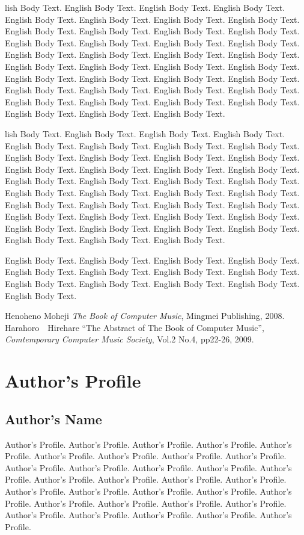 \documentclass{jsarticle}
\begin{document}
lish Body Text. English Body Text. English Body Text. English Body
Text. English Body Text. English Body Text. English Body Text. English
Body Text. English Body Text. English Body Text. English Body
Text. English Body Text. English Body Text. English Body Text. English
Body Text. English Body Text. English Body Text. English Body
Text. English Body Text. English Body Text. English Body Text. English
Body Text. English Body Text. English Body Text. English Body
Text. English Body Text. English Body Text. English Body Text. English
Body Text. English Body Text. English Body Text. English Body
Text. English Body Text. English Body Text. English Body Text. English
Body Text. English Body Text. English Body Text. English Body Text. 

lish Body Text. English Body Text. English Body Text. English Body
Text. English Body Text. English Body Text. English Body Text. English
Body Text. English Body Text. English Body Text. English Body
Text. English Body Text. English Body Text. English Body Text. English
Body Text. English Body Text. English Body Text. English Body
Text. English Body Text. English Body Text. English Body Text. English
Body Text. English Body Text. English Body Text. English Body
Text. English Body Text. English Body Text. English Body Text. English
Body Text. English Body Text. English Body Text. English Body
Text. English Body Text. English Body Text. English Body Text. English
Body Text. English Body Text. English Body Text. English Body Text. 

English Body Text. English Body Text. English Body Text. English
Body Text. English Body Text. English Body Text. English Body
Text. English Body Text. English Body Text. English Body Text. English
Body Text. English Body Text. English Body Text.


\begin{thebibliography}{citations}
 Henoheno Moheji {\it The Book of Computer Music},
	Mingmei Publishing, 2008.
 Harahoro　Hirehare ``The Abstract of The Book of
	Computer Music'', {\it Comtemporary Computer Music Society},
	Vol.2 No.4, pp22-26, 2009.
\end{thebibliography}

\section{Author's Profile}


\subsection*{Author's Name}

Author's Profile. Author's Profile. Author's Profile. Author's
Profile. Author's Profile. Author's Profile. Author's Profile. Author's
Profile. Author's Profile. Author's Profile. Author's Profile. Author's
Profile. Author's Profile. Author's Profile. Author's Profile. Author's
Profile. Author's Profile. Author's Profile. Author's Profile. Author's
Profile. Author's Profile. Author's Profile. Author's Profile. Author's
Profile. Author's Profile. Author's Profile. Author's Profile. Author's
Profile. Author's Profile. Author's Profile. Author's Profile. Author's
Profile. 
\end{document}
